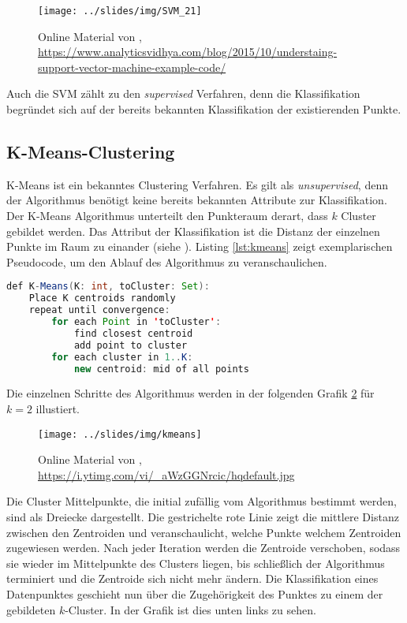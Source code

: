 \begin{figure}[h]
    \centering
    \texttt{[image: ../slides/img/SVM\_21]}
    \caption{Online Material von \cite{ray2015}, \url{https://www.analyticsvidhya.com/blog/2015/10/understaing-support-vector-machine-example-code/}\label{fig:svm}}
\end{figure}

Auch die SVM zählt zu den \textit{supervised} Verfahren, denn die Klassifikation begründet sich auf der bereits bekannten Klassifikation der existierenden Punkte.

\subsection{K-Means-Clustering}

K-Means ist ein bekanntes Clustering Verfahren. Es gilt als \textit{unsupervised}, denn der Algorithmus benötigt keine bereits bekannten Attribute zur Klassifikation. Der K-Means Algorithmus unterteilt den Punkteraum derart, dass $k$ Cluster gebildet werden. Das Attribut der Klassifikation ist die Distanz der einzelnen Punkte im Raum zu einander (siehe \cite{datamining2011}). Listing \ref{lst:kmeans} zeigt exemplarischen Pseudocode, um den Ablauf des Algorithmus zu veranschaulichen.

\begin{center}
\begin{lstlisting}[caption={K-Means Algorithmus \cite{lavrenko2013}},label=lst:kmeans,language=JAVA,label={lst:kmeans}]
def K-Means(K: int, toCluster: Set):
    Place K centroids randomly
    repeat until convergence:
        for each Point in 'toCluster':
            find closest centroid
            add point to cluster
        for each cluster in 1..K:
            new centroid: mid of all points
\end{lstlisting}
\end{center}

Die einzelnen Schritte des Algorithmus werden in der folgenden Grafik \ref{fig:kmeans} für $k = 2$ illustiert.

\begin{figure}[h]
    \centering
    \texttt{[image: ../slides/img/kmeans]}
    \caption{Online Material von \cite{lavrenko2013}, \url{https://i.ytimg.com/vi/_aWzGGNrcic/hqdefault.jpg}\label{fig:kmeans}}
\end{figure}

Die Cluster Mittelpunkte, die initial zufällig vom Algorithmus bestimmt werden, sind als Dreiecke dargestellt. Die gestrichelte rote Linie zeigt die mittlere Distanz zwischen den Zentroiden und veranschaulicht, welche Punkte welchem Zentroiden zugewiesen werden. Nach jeder Iteration werden die Zentroide verschoben, sodass sie wieder im Mittelpunkte des Clusters liegen, bis schließlich der Algorithmus terminiert und die Zentroide sich nicht mehr ändern. Die Klassifikation eines Datenpunktes geschieht nun über die Zugehörigkeit des Punktes zu einem der gebildeten $k$-Cluster. In der Grafik ist dies unten links zu sehen.